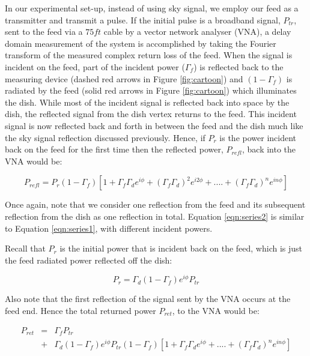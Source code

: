 \documentclass[12pt,preprint]{aastex}
\begin{document}
In our experimental set-up, instead of using sky signal, we employ
our feed as a transmitter and transmit a pulse. If the initial pulse is a broadband signal,
$P_{tr}$, sent to the feed via a $75ft$ cable by a vector network
analyser (VNA), a delay domain measurement of the system is accomplished by
taking the Fourier transform of the measured complex return loss of the feed. When the signal is incident on
the feed, part of the incident power ($\Gamma_{f}$) is reflected back to the
measuring device (dashed red arrows in Figure \ref{fig:cartoon}) and
$(1-\Gamma_{f})$ is radiated by the feed (solid red arrows in Figure
\ref{fig:cartoon}) which illuminates the dish. While most of the incident signal is reflected back into space by the dish, the reflected signal from the dish vertex returns to
the feed. This incident signal is now
reflected back and forth in between the feed and the dish much like the sky
signal reflection discussed previously.  Hence, if $P_{r}$ is the power
incident back on the feed for the first time then the reflected power, $P_{refl}$,
back into the VNA would be:

\begin{equation}\label{eqn:series2}
P_{refl} =  P_{r}(1-\Gamma_{f})[1+ \Gamma_{f}\Gamma_{d} e^{i\phi}+ (\Gamma_{f}\Gamma_{d})^2e^{i2\phi}+ ....+ (\Gamma_{f}\Gamma_{d})^{n}e^{in\phi}]
\end{equation}
 
Once again, note that we consider one reflection from the feed and its subsequent reflection from the dish as one reflection in total. Equation \ref{eqn:series2} is similar to Equation \ref{eqn:series1}, with different incident powers.

Recall that $P_{r}$ is the initial power that is incident back on the feed, which is just the feed radiated power reflected off the dish:
 
\begin{equation}
P_{r}= \Gamma_{d}(1-\Gamma_f)e^{i\phi} P_{tr}
\end{equation}

Also note that the first reflection of the signal sent by the VNA occurs at the feed end. Hence the total returned power $P_{ret}$, to the VNA  would be:

\begin{eqnarray}
P_{ret} & = & \Gamma_{f}P_{tr} \nonumber\\ 
 & + &   \Gamma_{d}(1-\Gamma_f)e^{i\phi} P_{tr}(1-\Gamma_{f}) [1+ \Gamma_{f}\Gamma_{d} e^{i\phi}+  ....+ (\Gamma_{f}\Gamma_{d})^{n}e^{in\phi}]\nonumber\\
 \end{eqnarray}
 
\end{document}
